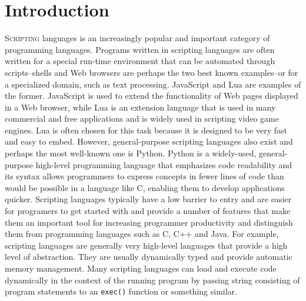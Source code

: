 \section{Introduction}

\lettrine[nindent=0em,lines=3]{S}{cripting} languages is an increasingly popular and important
category of programming languages. Programs written in scripting languages are often written for
a special run-time environment that can be automated through scripts--shells and Web browsers
are perhaps the two best known examples--or for a specialized domain, such as text processing.
JavaScript and Lua are examples of the former. JavaScript is used to extend the functionality
of Web pages displayed in a Web browser, while Lua is an extension language that is used in many 
commercial and free applications and is widely used in scripting video game engines. Lua is
often chosen for this task because it is designed to be very fast and easy to embed.
However, general-purpose scripting languages also exist and perhaps the most well-known one is Python.
Python is a widely-used, general-purpose high-level programming language that emphasizes code
readability and its syntax allows programmers to express concepts in fewer lines of code than would be 
possible in a language like C, enabling them to develop applications quicker. 
Scripting languages typically have a low barrier to entry and are easier for programers to 
get started with and provide a number of features that make them an important tool for increasing 
programmer productivity and distinguish them from programming languages such as C, C++ and Java. 
For example, scripting languages are generally very high-level languages that provide a high level of 
abstraction. They are usually dynamically typed and provide automatic memory management. Many
scripting languages can load and execute code dynamically in the context of the running program
by passing string consisting of program statements to an \texttt{exec()} function or something
similar.

